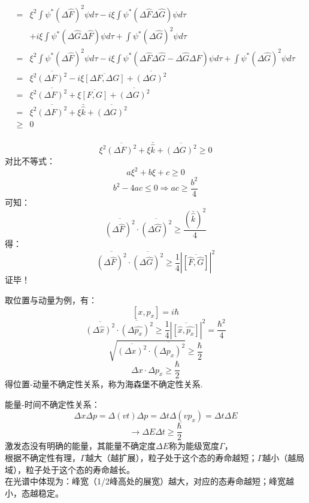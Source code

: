 \begin{frame}   
    $$
    \begin{aligned}
    =& \xi^{2} \int \psi^{*}(\Delta \hat{F})^{2} \psi d \tau-i \xi \int \psi^{*}(\Delta \hat{F} \Delta \hat{G}) \psi d \tau \\
    &+i \xi \int \psi^{*}(\Delta \hat{G} \Delta \hat{F}) \psi d \tau+\int \psi^{*}(\Delta \hat{G})^{2} \psi d \tau \\
    =& \xi^{2} \int \psi^{*}(\Delta \hat{F})^{2} \psi d \tau-i \xi \int \psi^{*}(\Delta \hat{F} \Delta \hat{G}-\Delta \hat{G} \Delta \hat{F}) \psi d \tau+\int \psi^{*}(\Delta \hat{G})^{2} \psi d \tau \\
    =& \xi^{2} \overline{(\Delta F)^{2}}-i \xi \overline{[\Delta F, \Delta G]}+\overline{(\Delta G)^{2}}\\
    =&\xi^{2} \overline{(\Delta F)^{2}}+\xi \overline{[F, G]}+\overline{(\Delta G)^{2}} \\
    =&\xi^{2} \overline{(\Delta F)^{2}}+\xi \bar{\hat{k}}+\overline{(\Delta G)^{2}} \\
    \geq & 0\\
    \end{aligned}
    $$
\end{frame} 

\begin{frame} 
    \[\xi^{2} \overline{(\Delta F)^{2}}+\xi \bar{\hat{k}}+\overline{(\Delta G)^{2}} \geq  0\]  
    对比不等式：
    $$
    a \xi^{2}+b \xi+c \geq 0
    $$
    $$
    b^{2}-4 a c \leq 0 \Rightarrow a c \geq \frac{b^{2}}{4}
    $$
    可知： 
    $$
    \overline{(\Delta \hat{F})^{2}} \cdot \overline{(\Delta \hat{G})^{2}} \geq \frac{(\bar{\hat{k}})^{2}}{4}
    $$
    得： 
    $$
    \boxed{\overline{(\Delta \hat{F})^{2}} \cdot \overline{(\Delta \hat{G})^{2}} \geq \frac{1}{4}|\overline{[\hat{F}, \hat{G}]}|^{2}}
    $$
    证毕！
\end{frame} 

\begin{frame}
取位置与动量为例，有：
$$ [x,p_x]=i\hbar $$
$$
\overline{(\Delta \hat{x})^{2}} \cdot \overline{(\Delta \hat{p_x})^{2}} 
\geq \frac{1}{4}|\overline{[\hat{x}, \hat{p_x}]}|^{2}=\frac{\hbar^2}{4}
$$
$$
\sqrt{\overline{(\Delta x)^{2}} \cdot \overline{(\Delta p_x)^{2}}} 
\geq \frac{\hbar}{2}
$$
$$  
\boxed{\Delta x \cdot \Delta p_x 
\geq \frac{\hbar}{2}}
$$ 
得位置-动量不确定性关系，称为海森堡不确定性关系.
\end{frame}

\begin{frame}
    能量-时间不确定性关系：
    \[\Delta x \Delta p = \Delta (vt)  \Delta p = \Delta t  \Delta (vp_x)= \Delta t  \Delta E \]
    \[\to \Delta E \Delta t \geq \frac{\hbar}{2}  \]
    {\Bullet} 激发态没有明确的能量，其能量不确定度$\Delta E$称为能级宽度$\Gamma$，\\ \vspace{0.6em}
    {\Bullet} 根据不确定性有理，$\Gamma$越大（越扩展），粒子处于这个态的寿命越短；$\Gamma$越小（越局域），粒子处于这个态的寿命越长。\\ \vspace{0.6em}
    {\Bullet} 在光谱中体现为：峰宽（1/2峰高处的展宽）越大，对应的态寿命越短；峰宽越小，态越稳定。 
\end{frame}

